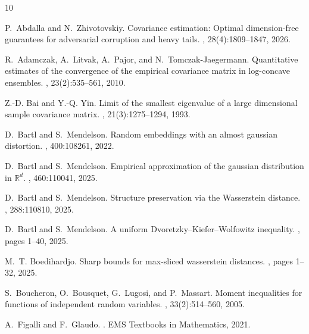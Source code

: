 \documentclass[11pt]{amsart}
\theoremstyle{definition}
\numberwithin{equation}{section}
\begin{document}
\begin{thebibliography}{10}

P.~Abdalla and N.~Zhivotovskiy.
\newblock Covariance estimation: Optimal dimension-free guarantees for
  adversarial corruption and heavy tails.
, 28(4):1809--1847,
  2026.

R.~Adamczak, A.~Litvak, A.~Pajor, and N.~Tomczak-Jaegermann.
\newblock Quantitative estimates of the convergence of the empirical covariance
  matrix in log-concave ensembles.
, 23(2):535--561,
  2010.

Z.-D. Bai and Y.-Q. Yin.
\newblock Limit of the smallest eigenvalue of a large dimensional sample
  covariance matrix.
, 21(3):1275--1294, 1993.

D.~Bartl and S.~Mendelson.
\newblock Random embeddings with an almost gaussian distortion.
, 400:108261, 2022.

D.~Bartl and S.~Mendelson.
\newblock Empirical approximation of the gaussian distribution in
  {$\mathbb{R}^d$}.
, 460:110041, 2025.

D.~Bartl and S.~Mendelson.
\newblock Structure preservation via the {W}asserstein distance.
, 288:110810, 2025.

D.~Bartl and S.~Mendelson.
\newblock A uniform {D}voretzky--{K}iefer--{W}olfowitz inequality.
, pages 1--40, 2025.

M.~T. Boedihardjo.
\newblock Sharp bounds for max-sliced wasserstein distances.
, pages 1--32, 2025.

S.~Boucheron, O.~Bousquet, G.~Lugosi, and P.~Massart.
\newblock Moment inequalities for functions of independent random variables.
, 33(2):514--560, 2005.

A.~Figalli and F.~Glaudo.
.
\newblock EMS Textbooks in Mathematics, 2021.


\end{thebibliography}
\end{document}
